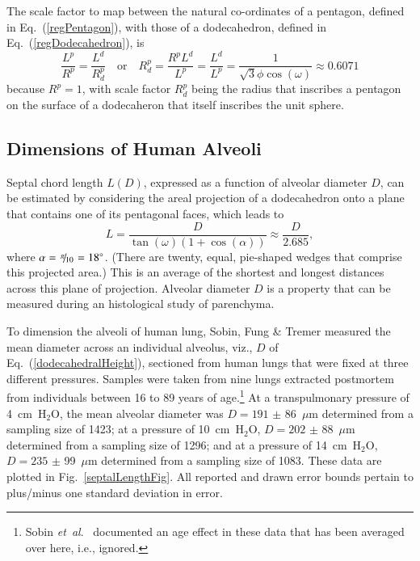 The scale factor to map between the natural co-ordinates of a pentagon, defined in Eq.~(\ref{regPentagon}), with those of a dodecahedron, defined in Eq.~(\ref{regDodecahedron}), is
\begin{equation}
	\frac{L^{\!p}}{R^p} = \frac{L^{\!d}}{R^p_d} 
	\quad \text{or} \quad
	R^p_d = \frac{R^p L^{\!d}}{L^{\!p}} = \frac{L^{\!d}}{L^{\!p}} = 
	\frac{1}{\sqrt{3} \phi \cos (\omega)} \approx 0.6071
	\label{scaleFactor}
\end{equation}
because $R^p = 1$, with scale factor $R^p_d$ being the radius that inscribes a pentagon on the surface of a dodecaheron that itself inscribes the unit sphere.

\subsection{Dimensions of Human Alveoli}
\label{alveolarSize}

Septal chord length $L(D)$, expressed as a function of alveolar diameter $D$, can be estimated by considering the areal projection of a dodecahedron onto a plane that contains one of its pentagonal faces, which leads to
\begin{equation}
	L = \frac{D}{\tan ( \omega ) ( 1 + \cos ( \alpha ) )} 
	\approx  \frac{D}{2.685} ,
\label{dodecahedralHeight}
\end{equation} 
where $\alpha = \textfrac{\pi}{10} = 18^{\circ}$.  (There are twenty, equal, pie-shaped wedges that comprise this projected area.)  This is an average of the shortest and longest distances across this plane of projection.  Alveolar diameter $D$ is a property that can be measured during an histological study of parenchyma.  

To dimension the alveoli of human lung, Sobin, Fung \& Tremer \cite{Sobinetal88} measured the mean diameter across an individual alveolus, viz., $D$ of Eq.~(\ref{dodecahedralHeight}),  sectioned from human lungs that were fixed at three different pressures.  Samples were taken from nine lungs extracted postmortem from individuals between 16 to 89 years of age.\footnote{%
	Sobin \textit{et~al}.\ \cite{Sobinetal88} documented an age effect in these data that has been averaged over here, i.e., ignored.
}
At a transpulmonary pressure of 4~cm~$\text{H}_2$O, the mean alveolar diameter was $D = 191$ $\pm$ 86~$\mu$m determined from a sampling size of 1423; at a pressure of 10~cm~$\text{H}_2$O, $D = 202$ $\pm$ 88~$\mu$m determined from a sampling size of 1296; and at a pressure of 14~cm~$\text{H}_2$O, $D = 235$ $\pm$ 99~$\mu$m determined from a sampling size of 1083.  These data are plotted in Fig.~\ref{septalLengthFig}.  All reported and drawn error bounds pertain to plus\slash minus one standard deviation in error.

